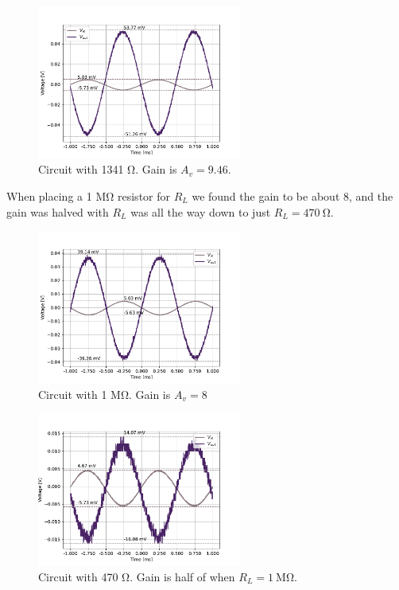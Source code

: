 \documentclass{../../ece-report}
\begin{document}
\begin{figure}[h!]
  \centering
  \includegraphics[width=0.6\textwidth]{../plots/pdf/gain9_46.pdf}
  \caption{Circuit with 1341 \si{\ohm}. Gain is $A_v=9.46$.}\label{fig:gain9_47}
\end{figure}

When placing a 1 \si{\Mohm} resistor for $R_L$ we found the gain to be about 8,
and the gain was halved with $R_L$ was all the way down to just $R_L = 470~\si{\ohm}$.

\begin{figure}[h!]
  \centering
  \includegraphics[width=0.6\textwidth]{../plots/pdf/rl_1meg.pdf}
  \caption{Circuit with 1 \si{\Mohm}. Gain is $A_v=8$}\label{fig:1meg}
\end{figure}

\begin{figure}[h!]
  \centering
  \includegraphics[width=0.6\textwidth]{../plots/pdf/rl_470.pdf}
  \caption{Circuit with 470 \si{\ohm}. Gain is half of when $R_L=1~\si{\Mohm}$.}\label{fig:470ohm}
\end{figure}
\end{document}
